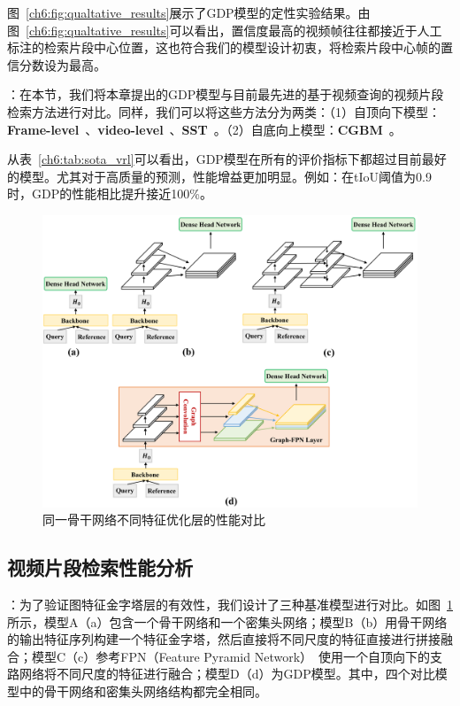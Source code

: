 图~\ref{ch6:fig:qualtative_results}展示了GDP模型的定性实验结果。由图~\ref{ch6:fig:qualtative_results}可以看出，置信度最高的视频帧往往都接近于人工标注的检索片段中心位置，这也符合我们的模型设计初衷，将检索片段中心帧的置信分数设为最高。


\textbf{}：在本节，我们将本章提出的GDP模型与目前最先进的基于视频查询的视频片段检索方法进行对比。同样，我们可以将这些方法分为两类：（1）自顶向下模型：\textbf{Frame-level}~\cite{feng2018video}、\textbf{video-level}~\cite{feng2018video}、\textbf{SST}~\cite{buch2017sst}。（2）自底向上模型：\textbf{CGBM}~\cite{feng2018video}。

从表~\ref{ch6:tab:sota_vrl}可以看出，GDP模型在所有的评价指标下都超过目前最好的模型。尤其对于高质量的预测，性能增益更加明显。例如：在tIoU阈值为0.9时，GDP的性能相比提升接近100\%。


\begin{figure}[tbp]
    \centering
    \includegraphics[width=0.9\linewidth]{chapter6/res/ablative_backbone.pdf}
    \caption{同一骨干网络不同特征优化层的性能对比}
    \label{ch6:fig:ablative_backbone}
\end{figure}


\subsection{视频片段检索性能分析}

\textbf{}：为了验证图特征金字塔层的有效性，我们设计了三种基准模型进行对比。如图~\ref{ch6:fig:ablative_backbone}所示，模型A（a）包含一个骨干网络和一个密集头网络；模型B（b）用骨干网络的输出特征序列构建一个特征金字塔，然后直接将不同尺度的特征直接进行拼接融合；模型C（c）参考FPN（Feature Pyramid Network）~\cite{lin2017feature}使用一个自顶向下的支路网络将不同尺度的特征进行融合；模型D（d）为GDP模型。其中，四个对比模型中的骨干网络和密集头网络结构都完全相同。

